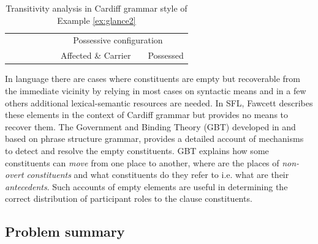 \begin{table}[!ht]
{\begin{tabular}{cccccc|c|c|c|c|c|}
            &                             &                                      &                         & \multicolumn{1}{c|}{}               & \multicolumn{6}{c|}{Possessive configuration}                                                         \\ \cline{6-11} 
            &                             &                                      &                         &                                     &                & Affected \& Carrier &                  & \multicolumn{3}{c|}{Possessed}                 \\ \cline{7-7} \cline{9-11} 
        \end{tabular}%
    }
    \caption{Transitivity analysis in Cardiff grammar style \citep{Neale2002,Fawcett2009} of Example \ref{ex:glance2}} 
    \label{tab:glance-analsys-semantic}
\end{table}

In language there are cases where constituents are empty but recoverable from the immediate vicinity by relying in most cases on syntactic means and in a few others additional lexical-semantic resources are needed.
In SFL, Fawcett describes these elements in the context of Cardiff grammar \citep[115,135,194]{Fawcett2008} but provides no means to recover them. The Government and Binding Theory (GBT) developed in \citep{Chomsky81, Chomsky1982, Chomsky1986} and based on phrase structure grammar, provides a detailed account of mechanisms to detect and resolve the empty constituents. GBT explains how some constituents can \textit{move} from one place to another, where are the places of \textit{non-overt constituents} and what constituents do they refer to i.e. what are their \textit{antecedents}. Such accounts of empty elements are useful in determining the correct distribution of participant roles to the clause constituents.

\subsection{Problem summary}

